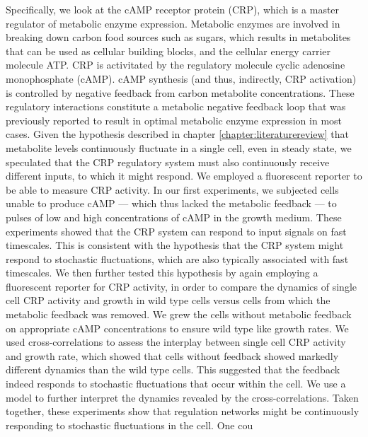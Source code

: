 




Specifically, we look at the 
cAMP receptor protein (CRP), 
which is a master regulator of metabolic enzyme expression.
Metabolic enzymes are involved in breaking down carbon food sources such as sugars, which results in metabolites that can be used as cellular building blocks, 
and the cellular energy carrier molecule ATP.
CRP is activitated by the regulatory molecule cyclic adenosine monophosphate (cAMP). 
cAMP synthesis (and thus, indirectly, CRP activation) is controlled by negative feedback from carbon metabolite concentrations.
These regulatory interactions constitute a metabolic negative feedback loop that was previously reported to result in optimal metabolic enzyme expression in most cases.
%
Given the hypothesis described in chapter \ref{chapter:literaturereview} that metabolite levels continuously fluctuate in a single cell, even in steady state, 
we speculated that the CRP regulatory system must also continuously receive different inputs, to which it might respond.
%
We employed a fluorescent reporter to be able to measure CRP activity.
In our first experiments, we subjected cells unable to produce cAMP --- which thus lacked the metabolic feedback --- 
to pulses of low and high concentrations of cAMP in the growth medium.
%
These experiments showed that the CRP system can respond to input signals on fast timescales. 
This is consistent with the hypothesis that the CRP system might respond to stochastic fluctuations, 
which are also typically associated with fast timescales.
%
We then further tested this hypothesis by 
again 
employing a fluorescent reporter for CRP activity, 
in order to compare the dynamics of single cell CRP activity and growth in 
wild type cells versus cells from which the metabolic feedback was removed.
%
We grew the cells without metabolic feedback on appropriate cAMP concentrations to ensure wild type like growth rates.
%
We used cross-correlations to assess the interplay between single cell CRP activity and growth rate,
which showed that cells without feedback showed markedly different dynamics than the wild type cells.
%
This suggested that the feedback indeed responds to stochastic fluctuations that occur within the cell.
%
We use a model to further interpret the dynamics revealed by the cross-correlations.
%
Taken together, these experiments show that regulation networks might be continuously responding to stochastic fluctuations in the cell.
%
One cou


